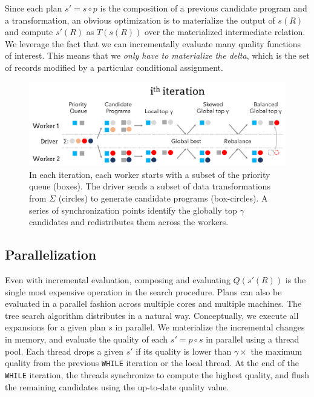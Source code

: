 Since each plan $s' = s\circ p$ is the composition of a previous candidate program and a transformation, an obvious optimization is to materialize the output of $s(R)$ and compute $s'(R)$ as $T(s(R))$ over the materialized intermediate relation.
We leverage the fact that we can incrementally evaluate many quality functions of interest.
This means that we \emph{only have to materialize the delta}, which is the set of records modified by a particular conditional assignment.

\begin{figure}[t]
    \centering
    \includegraphics[width=\columnwidth]{figures/distributed.pdf}
    \caption{In each iteration, each worker starts with a subset of the priority queue (boxes).  The driver sends a subset of data transformations from $\Sigma$ (circles) to generate candidate programs (box-circles).  A series of synchronization points identify the globally top $\gamma$ candidates and redistributes them across the workers.   \label{fig:algo}}
\end{figure}

\subsection{Parallelization} 
Even with incremental evaluation, composing and evaluating $Q(s'(R))$ is the single most expensive operation in the search procedure.   
Plans can also be evaluated in a parallel fashion across multiple cores and multiple machines. 
The tree search algorithm distributes in a natural way.
Conceptually, we execute all expansions for a given plan $s$ in parallel.  We materialize the incremental changes in memory, and evaluate the quality of each $s' = p\circ s$ in parallel using a  thread pool.  Each thread drops a given $s'$ if its quality is lower than $\gamma\times$ the maximum quality from the previous \texttt{WHILE} iteration or the local thread.  At the end of the \texttt{WHILE} iteration, the threads synchronize to compute the highest quality, and flush the remaining candidates using the up-to-date quality value.

